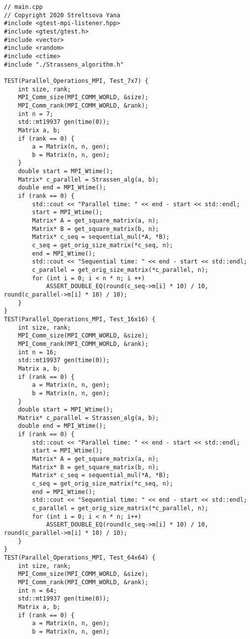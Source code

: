 \documentclass{report}
\begin{document}
\begin{lstlisting}
// main.cpp
// Copyright 2020 Streltsova Yana
#include <gtest-mpi-listener.hpp>
#include <gtest/gtest.h>
#include <vector>
#include <random>
#include <ctime>
#include "./Strassens_algorithm.h"

TEST(Parallel_Operations_MPI, Test_7x7) {
    int size, rank;
    MPI_Comm_size(MPI_COMM_WORLD, &size);
    MPI_Comm_rank(MPI_COMM_WORLD, &rank);
    int n = 7;
    std::mt19937 gen(time(0));
    Matrix a, b;
    if (rank == 0) {
        a = Matrix(n, n, gen);
        b = Matrix(n, n, gen);
    }
    double start = MPI_Wtime();
    Matrix* c_parallel = Strassen_alg(a, b);
    double end = MPI_Wtime();
    if (rank == 0) {
        std::cout << "Parallel time: " << end - start << std::endl;
        start = MPI_Wtime();
        Matrix* A = get_square_matrix(a, n);
        Matrix* B = get_square_matrix(b, n);
        Matrix* c_seq = sequential_mul(*A, *B);
        c_seq = get_orig_size_matrix(*c_seq, n);
        end = MPI_Wtime();
        std::cout << "Sequential time: " << end - start << std::endl;
        c_parallel = get_orig_size_matrix(*c_parallel, n);
        for (int i = 0; i < n * n; i ++)
            ASSERT_DOUBLE_EQ(round(c_seq->m[i] * 10) / 10, round(c_parallel->m[i] * 10) / 10);
    }
}
TEST(Parallel_Operations_MPI, Test_16x16) {
    int size, rank;
    MPI_Comm_size(MPI_COMM_WORLD, &size);
    MPI_Comm_rank(MPI_COMM_WORLD, &rank);
    int n = 16;
    std::mt19937 gen(time(0));
    Matrix a, b;
    if (rank == 0) {
        a = Matrix(n, n, gen);
        b = Matrix(n, n, gen);
    }
    double start = MPI_Wtime();
    Matrix* c_parallel = Strassen_alg(a, b);
    double end = MPI_Wtime();
    if (rank == 0) {
        std::cout << "Parallel time: " << end - start << std::endl;
        start = MPI_Wtime();
        Matrix* A = get_square_matrix(a, n);
        Matrix* B = get_square_matrix(b, n);
        Matrix* c_seq = sequential_mul(*A, *B);
        c_seq = get_orig_size_matrix(*c_seq, n);
        end = MPI_Wtime();
        std::cout << "Sequential time: " << end - start << std::endl;
        c_parallel = get_orig_size_matrix(*c_parallel, n);
        for (int i = 0; i < n * n; i++)
            ASSERT_DOUBLE_EQ(round(c_seq->m[i] * 10) / 10, round(c_parallel->m[i] * 10) / 10);
    }
}
TEST(Parallel_Operations_MPI, Test_64x64) {
    int size, rank;
    MPI_Comm_size(MPI_COMM_WORLD, &size);
    MPI_Comm_rank(MPI_COMM_WORLD, &rank);
    int n = 64;
    std::mt19937 gen(time(0));
    Matrix a, b;
    if (rank == 0) {
        a = Matrix(n, n, gen);
        b = Matrix(n, n, gen);

\end{lstlisting}
\end{document}
